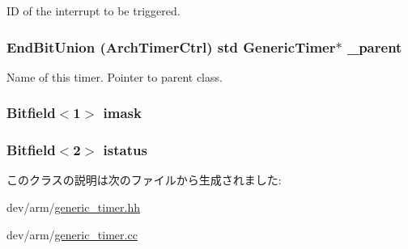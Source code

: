 ID of the interrupt to be triggered. \hypertarget{classGenericTimer_1_1ArchTimer_a4de0833faa175ea06f056c4661ddba69}{
\subsubsection[{\_\-parent}]{\setlength{\rightskip}{0pt plus 5cm}EndBitUnion (ArchTimerCtrl) std {\bf GenericTimer}$\ast$ {\bf \_\-parent}}}
\label{classGenericTimer_1_1ArchTimer_a4de0833faa175ea06f056c4661ddba69}


Name of this timer. Pointer to parent class. \hypertarget{classGenericTimer_1_1ArchTimer_ad52539c365dfb10b7ee0d2bdc178c2d8}{
\subsubsection[{imask}]{\setlength{\rightskip}{0pt plus 5cm}Bitfield$<$1$>$ {\bf imask}}}
\label{classGenericTimer_1_1ArchTimer_ad52539c365dfb10b7ee0d2bdc178c2d8}
\hypertarget{classGenericTimer_1_1ArchTimer_a8bbee8ee464bb7f6275e9f06c6e279fe}{
\subsubsection[{istatus}]{\setlength{\rightskip}{0pt plus 5cm}Bitfield$<$2$>$ {\bf istatus}}}
\label{classGenericTimer_1_1ArchTimer_a8bbee8ee464bb7f6275e9f06c6e279fe}


このクラスの説明は次のファイルから生成されました:\begin{DoxyCompactItemize}
\item 
dev/arm/\hyperlink{generic__timer_8hh}{generic\_\-timer.hh}\item 
dev/arm/\hyperlink{generic__timer_8cc}{generic\_\-timer.cc}\end{DoxyCompactItemize}
